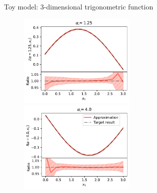 \documentclass[8pt, xcolor={svgnames}, hyperref={linkcolor=black}]{beamer}
\begin{document}
\begin{frame}{Toy model: $3$-dimensional trigonometric function}
\begin{figure}  
    \includegraphics[width=0.5\textwidth]{figures/cos4d_1.pdf}%
    \includegraphics[width=0.5\textwidth]{figures/cos4d_2.pdf}
\end{figure}

\end{frame}
\end{document}
